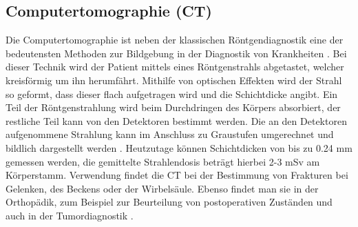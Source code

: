 \subsection{Computertomographie (CT)}
\label{sec:CT}
Die Computertomographie ist neben der klassischen Röntgendiagnostik eine der bedeutensten Methoden zur Bildgebung in der 
Diagnostik von Krankheiten \cite{Artikel3,Artikel4}. Bei dieser Technik wird der Patient mittels eines Röntgenstrahls 
abgetastet, welcher kreisförmig um ihn herumfährt. Mithilfe von optischen Effekten wird der Strahl so geformt, dass dieser flach 
aufgetragen wird und die Schichtdicke angibt. Ein Teil der Röntgenstrahlung wird beim Durchdringen des Körpers absorbiert, der restliche
Teil kann von den Detektoren bestimmt werden. Die an den Detektoren aufgenommene Strahlung kann im Anschluss zu Graustufen 
umgerechnet und bildlich dargestellt werden \cite{Artikel3}. 
Heutzutage können Schichtdicken von bis zu 0.24 mm gemessen werden, die gemittelte Strahlendosis beträgt hierbei 2-3 mSv am Körperstamm.
Verwendung findet die CT bei der Bestimmung von Frakturen bei Gelenken, des Beckens oder der Wirbelsäule. Ebenso findet man sie 
in der Orthopädik, zum Beispiel zur Beurteilung von postoperativen Zuständen und auch in der Tumordiagnostik \cite{Artikel4}.






